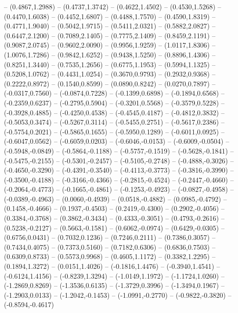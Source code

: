 {	-- (0.4867,1.2988)
	-- (0.4737,1.3742)
	-- (0.4622,1.4502)
	-- (0.4530,1.5268)
	-- (0.4470,1.6038)
	-- (0.4452,1.6807)
	-- (0.4488,1.7570)
	-- (0.4590,1.8319)
	-- (0.4771,1.9040)
	-- (0.5042,1.9715)
	-- (0.5411,2.0321)
	-- (0.5882,2.0827)
	-- (0.6447,2.1200)
	-- (0.7089,2.1405)
	-- (0.7775,2.1409)
	-- (0.8459,2.1191)
	-- (0.9087,2.0745)
	-- (0.9602,2.0090)
	-- (0.9956,1.9259)
	-- (1.0117,1.8306)
	-- (1.0076,1.7286)
	-- (0.9842,1.6252)
	-- (0.9438,1.5250)
	-- (0.8896,1.4306)
	-- (0.8251,1.3440)
	-- (0.7535,1.2656)
	-- (0.6775,1.1953)
	-- (0.5994,1.1325)
	-- (0.5208,1.0762)
	-- (0.4431,1.0254)
	-- (0.3670,0.9793)
	-- (0.2932,0.9368)
	-- (0.2222,0.8972)
	-- (0.1540,0.8599)
	-- (0.0890,0.8242)
	-- (0.0270,0.7897)
	-- (-0.0317,0.7560)
	-- (-0.0874,0.7228)
	-- (-0.1399,0.6898)
	-- (-0.1894,0.6568)
	-- (-0.2359,0.6237)
	-- (-0.2795,0.5904)
	-- (-0.3201,0.5568)
	-- (-0.3579,0.5228)
	-- (-0.3928,0.4885)
	-- (-0.4250,0.4538)
	-- (-0.4545,0.4187)
	-- (-0.4812,0.3832)
	-- (-0.5053,0.3474)
	-- (-0.5267,0.3114)
	-- (-0.5455,0.2751)
	-- (-0.5617,0.2386)
	-- (-0.5754,0.2021)
	-- (-0.5865,0.1655)
	-- (-0.5950,0.1289)
	-- (-0.6011,0.0925)
	-- (-0.6047,0.0562)
	-- (-0.6059,0.0203)
	-- (-0.6046,-0.0153)
	-- (-0.6009,-0.0504)
	-- (-0.5948,-0.0849)
	-- (-0.5864,-0.1188)
	-- (-0.5757,-0.1519)
	-- (-0.5628,-0.1841)
	-- (-0.5475,-0.2155)
	-- (-0.5301,-0.2457)
	-- (-0.5105,-0.2748)
	-- (-0.4888,-0.3026)
	-- (-0.4650,-0.3290)
	-- (-0.4391,-0.3540)
	-- (-0.4113,-0.3773)
	-- (-0.3816,-0.3990)
	-- (-0.3500,-0.4188)
	-- (-0.3166,-0.4366)
	-- (-0.2815,-0.4524)
	-- (-0.2447,-0.4660)
	-- (-0.2064,-0.4773)
	-- (-0.1665,-0.4861)
	-- (-0.1253,-0.4923)
	-- (-0.0827,-0.4958)
	-- (-0.0389,-0.4963)
	-- (0.0060,-0.4939)
	-- (0.0518,-0.4882)
	-- (0.0985,-0.4792)
	-- (0.1458,-0.4666)
	-- (0.1937,-0.4503)
	-- (0.2419,-0.4300)
	-- (0.2902,-0.4056)
	-- (0.3384,-0.3768)
	-- (0.3862,-0.3434)
	-- (0.4333,-0.3051)
	-- (0.4793,-0.2616)
	-- (0.5238,-0.2127)
	-- (0.5663,-0.1581)
	-- (0.6062,-0.0974)
	-- (0.6429,-0.0305)
	-- (0.6756,0.0431)
	-- (0.7032,0.1236)
	-- (0.7246,0.2111)
	-- (0.7386,0.3057)
	-- (0.7434,0.4075)
	-- (0.7373,0.5160)
	-- (0.7182,0.6306)
	-- (0.6836,0.7503)
	-- (0.6309,0.8733)
	-- (0.5573,0.9968)
	-- (0.4605,1.1172)
	-- (0.3382,1.2295)
	-- (0.1894,1.3272)
	-- (0.0151,1.4026)
	-- (-0.1816,1.4476)
	-- (-0.3940,1.4541)
	-- (-0.6124,1.4156)
	-- (-0.8239,1.3294)
	-- (-1.0149,1.1972)
	-- (-1.1724,1.0260)
	-- (-1.2869,0.8269)
	-- (-1.3536,0.6135)
	-- (-1.3729,0.3996)
	-- (-1.3494,0.1967)
	-- (-1.2903,0.0133)
	-- (-1.2042,-0.1453)
	-- (-1.0991,-0.2770)
	-- (-0.9822,-0.3820)
	-- (-0.8594,-0.4617)
}
